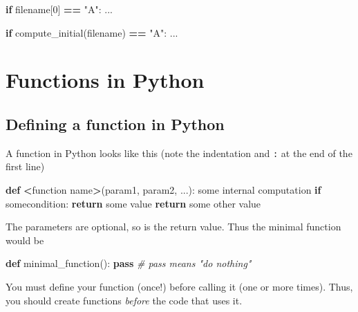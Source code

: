 \documentclass[
]{book}
\newenvironment{Shaded}{\begin{snugshade}}{\end{snugshade}}
\newcommand{\CommentTok}[1]{\textcolor[rgb]{0.56,0.35,0.01}{\textit{#1}}}
\newcommand{\ControlFlowTok}[1]{\textcolor[rgb]{0.13,0.29,0.53}{\textbf{#1}}}
\newcommand{\DecValTok}[1]{\textcolor[rgb]{0.00,0.00,0.81}{#1}}
\newcommand{\KeywordTok}[1]{\textcolor[rgb]{0.13,0.29,0.53}{\textbf{#1}}}
\newcommand{\NormalTok}[1]{#1}
\newcommand{\OperatorTok}[1]{\textcolor[rgb]{0.81,0.36,0.00}{\textbf{#1}}}
\newcommand{\StringTok}[1]{\textcolor[rgb]{0.31,0.60,0.02}{#1}}
\begin{document}
\begin{Shaded}
\begin{Highlighting}[]
\ControlFlowTok{if}\NormalTok{ filename[}\DecValTok{0}\NormalTok{] }\OperatorTok{==} \StringTok{"A"}\NormalTok{:}
\NormalTok{    ...}
    
\ControlFlowTok{if}\NormalTok{ compute\_initial(filename) }\OperatorTok{==} \StringTok{"A"}\NormalTok{:}
\NormalTok{    ...}
\end{Highlighting}
\end{Shaded}

\hypertarget{functions-in-python}{%
\section{Functions in Python}\label{functions-in-python}}

\hypertarget{defining-a-function-in-python}{%
\subsection{Defining a function in Python}\label{defining-a-function-in-python}}

A function in Python looks like this (note the indentation and \texttt{:} at the end of the first line)

\begin{Shaded}
\begin{Highlighting}[]
\KeywordTok{def} \OperatorTok{\textless{}}\NormalTok{function name}\OperatorTok{\textgreater{}}\NormalTok{(param1, param2, ...):}
\NormalTok{    some internal computation}
    \ControlFlowTok{if}\NormalTok{ somecondition:}
        \ControlFlowTok{return}\NormalTok{ some value}
    \ControlFlowTok{return}\NormalTok{ some other value}
\end{Highlighting}
\end{Shaded}

The parameters are optional, so is the return value. Thus the minimal function would be

\begin{Shaded}
\begin{Highlighting}[]
\KeywordTok{def}\NormalTok{ minimal\_function():}
    \ControlFlowTok{pass} \CommentTok{\# pass means "do nothing"}
\end{Highlighting}
\end{Shaded}

You must define your function (once!) before calling it (one or more times). Thus, you should create functions \emph{before} the code that uses it.
\end{document}
